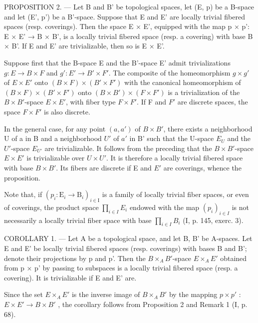 PROPOSITION 2. --- Let B and B' be topological spaces, let (E, p) be a B-space and let (E', p') be a B'-space. Suppose that E and E' are locally trivial fibered spaces (resp. coverings). Then the space E × E', equipped with the map p × p': E × E' → B × B', is a locally trivial fibered space (resp. a covering) with base B × B'. If E and E' are trivializable, then so is E × E'.

Suppose first that the B-space E and the B'-space E' admit trivializations \(g: E \to B \times F\) and \(g': E' \to B' \times F'\). The composite of the homeomorphism \(g \times g'\) of \(E \times E'\) onto \((B \times F) \times (B' \times F')\) with the canonical homeomorphism of \((B \times F) \times (B' \times F')\) onto \((B \times B') \times (F \times F')\) is a trivialization of the \(B \times B'\)-space \(E \times E'\), with fiber type \(F \times F'\). If F and \(F'\) are discrete spaces, the space \(F \times F'\) is also discrete.

In the general case, for any point \((a, a')\) of \(B \times B'\), there exists a neighborhood U of a in B and a neighborhood \(U'\) of \(a'\) in B' such that the U-space \(E_{U}\) and the \(U'\)-space \(E_{U'}\) are trivializable. It follows from the preceding that the \(B \times B'\)-space \(E \times E'\) is trivializable over \(U \times U'\). It is therefore a locally trivial fibered space with base \(B \times B'\). Its fibers are discrete if E and \(E'\) are coverings, whence the proposition.

Note that, if \((p_{i} \colon \mathrm{E}_{i} \to \mathrm{B}_{i})_{i \in \mathrm{I}}\) is a family of locally trivial fiber spaces, or even of coverings, the product space \(\prod_{i \in I} E_{i}\) endowed with the map \((p_{i})_{i \in I}\) is not necessarily a locally trivial fiber space with base \(\prod_{i \in I} B_{i}\) (I, p. 145, exerc. 3).

COROLLARY 1. --- Let A be a topological space, and let B, B' be A-spaces. Let E and E' be locally trivial fibered spaces (resp. coverings) with bases B and B'; denote their projections by p and p'. Then the \(B \times_{A} B'\)-space \(E \times_{A} E'\) obtained from p × p' by passing to subspaces is a locally trivial fibered space (resp. a covering). It is trivializable if E and E' are.

Since the set \(E \times_{A} E'\) is the inverse image of \(B \times_{A} B'\) by the mapping \(p \times p'\) : \(E \times E' \to B \times B'\) , the corollary follows from Proposition 2 and Remark 1 (I, p. 68).


